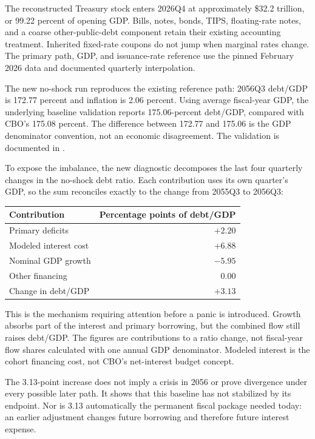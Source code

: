 \documentclass[11pt]{article}
\begin{document}
The reconstructed Treasury stock enters 2026Q4 at approximately \$32.2 trillion, or
99.22 percent of opening GDP. Bills, notes, bonds, TIPS, floating-rate notes, and a coarse
other-public-debt component retain their existing accounting treatment. Inherited fixed-rate
coupons do not jump when marginal rates change. The primary path, GDP, and issuance-rate
reference use the pinned February 2026 data and documented quarterly interpolation.

The new no-shock run reproduces the existing reference path: 2056Q3 debt/GDP is
172.77 percent and inflation is 2.06 percent. Using average fiscal-year GDP, the underlying
baseline validation reports 175.06-percent debt/GDP, compared with CBO's 175.08 percent.
The difference between 172.77 and 175.06 is the GDP denominator convention, not an economic
disagreement. The validation is documented in .

To expose the imbalance, the new diagnostic decomposes the last four quarterly changes
in the no-shock debt ratio. Each contribution uses its own quarter's GDP, so the sum
reconciles exactly to the change from 2055Q3 to 2056Q3:
\begin{center}
\begin{tabular}{lr}
\toprule
Contribution & Percentage points of debt/GDP\\
\midrule
Primary deficits & $+2.20$\\
Modeled interest cost & $+6.88$\\
Nominal GDP growth & $-5.95$\\
Other financing & $0.00$\\
\midrule
Change in debt/GDP & $+3.13$\\
\bottomrule
\end{tabular}
\end{center}
This is the mechanism requiring attention before a panic is introduced. Growth absorbs
part of the interest and primary borrowing, but the combined flow still raises debt/GDP.
The figures are contributions to a ratio change, not fiscal-year flow shares calculated
with one annual GDP denominator. Modeled interest is the cohort financing cost, not CBO's
net-interest budget concept.

The 3.13-point increase does not imply a crisis in 2056 or prove divergence under every
possible later path. It shows that this baseline has not stabilized by its endpoint.
Nor is 3.13 automatically the permanent fiscal package needed today: an earlier adjustment
changes future borrowing and therefore future interest expense.
\end{document}
